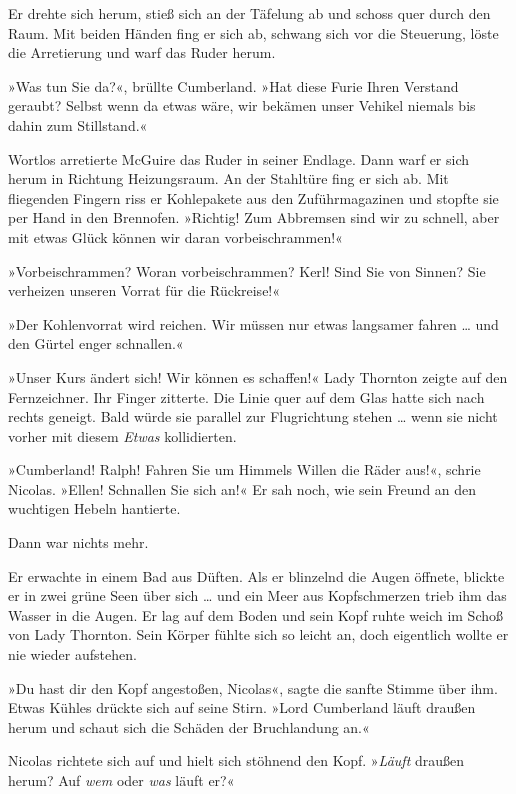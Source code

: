 Er drehte sich herum, stieß sich an der Täfelung ab und schoss quer
durch den Raum. Mit beiden Händen fing er sich ab, schwang sich vor
die Steuerung, löste die Arretierung und warf das Ruder herum.

»Was tun Sie da?«, brüllte Cumberland. »Hat diese Furie Ihren
Verstand geraubt? Selbst wenn da etwas wäre, wir bekämen unser
Vehikel niemals bis dahin zum Stillstand.«

Wortlos arretierte McGuire das Ruder in seiner Endlage. Dann warf
er sich herum in Richtung Heizungsraum. An der Stahltüre fing er
sich ab. Mit fliegenden Fingern riss er Kohlepakete aus den
Zuführmagazinen und stopfte sie per Hand in den Brennofen.
»Richtig! Zum Abbremsen sind wir zu schnell, aber mit etwas Glück
können wir daran vorbeischrammen!«

»Vorbeischrammen? Woran vorbeischrammen? Kerl! Sind Sie von Sinnen?
Sie verheizen unseren Vorrat für die Rückreise!«

»Der Kohlenvorrat wird reichen. Wir müssen nur etwas langsamer
fahren … und den Gürtel enger schnallen.«

»Unser Kurs ändert sich! Wir können es schaffen!« Lady Thornton
zeigte auf den Fernzeichner. Ihr Finger zitterte. Die Linie quer
auf dem Glas hatte sich nach rechts geneigt. Bald würde sie
parallel zur Flugrichtung stehen … wenn sie nicht vorher mit diesem
\emph{Etwas} kollidierten.

»Cumberland! Ralph! Fahren Sie um Himmels Willen die Räder aus!«,
schrie Nicolas. »Ellen! Schnallen Sie sich an!« Er sah noch, wie
sein Freund an den wuchtigen Hebeln hantierte.

\bigpar

Dann war nichts mehr.

\tb

Er erwachte in einem Bad aus Düften. Als er blinzelnd die Augen
öffnete, blickte er in zwei grüne Seen über sich … und ein Meer aus
Kopfschmerzen trieb ihm das Wasser in die Augen. Er lag auf dem
Boden und sein Kopf ruhte weich im Schoß von Lady Thornton. Sein
Körper fühlte sich so leicht an, doch eigentlich wollte er nie
wieder aufstehen.

»Du hast dir den Kopf angestoßen, Nicolas«, sagte die sanfte Stimme
über ihm. Etwas Kühles drückte sich auf seine Stirn. »Lord
Cumberland läuft draußen herum und schaut sich die Schäden der
Bruchlandung an.«

\bigpar

Nicolas richtete sich auf und hielt sich stöhnend den Kopf.
»\emph{Läuft} draußen herum? Auf \emph{wem} oder \emph{was} läuft
er?«

